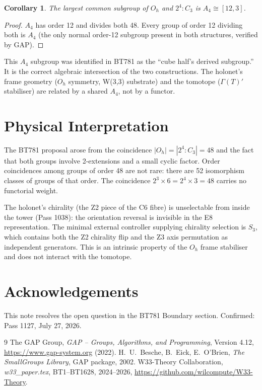 \documentclass[11pt]{amsart}
\newtheorem{corollary}[theorem]{Corollary}
\begin{document}
\begin{corollary}
The largest common subgroup of $O_h$ and $2^4{:}C_3$ is $A_4 \cong [12,3]$.
\end{corollary}

\begin{proof}
$A_4$ has order 12 and divides both 48.  Every group of order 12 dividing both is
$A_4$ (the only normal order-12 subgroup present in both structures, verified by GAP).
\end{proof}

This $A_4$ subgroup was identified in BT781 as the ``cube half's derived subgroup.''
It is the correct algebraic intersection of the two constructions.  The holonet's
frame geometry ($O_h$ symmetry, W(3,3) substrate) and the tomotope ($\Gamma(T)'$ stabiliser)
are related by a shared $A_4$, not by a functor.

\section{Physical Interpretation}

The BT781 proposal arose from the coincidence $|O_h| = |2^4{:}C_3| = 48$ and the
fact that both groups involve 2-extensions and a small cyclic factor.  Order
coincidences among groups of order 48 are not rare: there are 52 isomorphism classes
of groups of that order.  The coincidence $2^3 \times 6 = 2^4 \times 3 = 48$ carries
no functorial weight.

The holonet's chirality (the Z2 piece of the C6 fibre) is unselectable from inside
the tower (Pass 1038): the orientation reversal is invisible in the E8 representation.
The minimal external controller supplying chirality selection is $S_3$, which contains
both the Z2 chirality flip and the Z3 axis permutation as independent generators.
This is an intrinsic property of the $O_h$ frame stabiliser and does not interact
with the tomotope.

\section*{Acknowledgements}
This note resolves the open question in the BT781 Boundary section.
Confirmed: Pass 1127, July 27, 2026.

\begin{thebibliography}{9}
 The GAP Group, \textit{GAP -- Groups, Algorithms, and Programming},
  Version 4.12, \url{https://www.gap-system.org} (2022).
 H.~U.~Besche, B.~Eick, E.~O'Brien,
  \textit{The SmallGroups Library}, GAP package, 2002.
 W33-Theory Collaboration, \textit{w33\_paper.tex}, BT1--BT1628, 2024--2026,
  \url{https://github.com/wilcompute/W33-Theory}.
\end{thebibliography}
\end{document}
